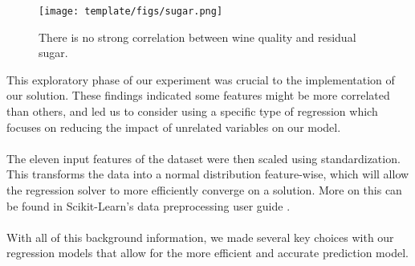 \begin{figure}[htb]

  \centering  %

  \texttt{[image: template/figs/sugar.png]}

  \caption{There is no strong correlation between wine quality and residual sugar.}

  \label{fig:sugar}

\end{figure}
This exploratory phase of our experiment was crucial to the implementation of our solution. These findings indicated some features might be more correlated than others, and led us to consider using a specific type of regression which focuses on reducing the impact of unrelated variables on our model. \\\\
The eleven input features of the dataset were then scaled using standardization. This transforms the data into a normal distribution feature-wise, which will allow the regression solver to more efficiently converge on a solution. More on this can be found in Scikit-Learn’s data preprocessing user guide \cite{sklearn_api}. \\\\
With all of this background information, we made several key choices with our regression models that allow for the more efficient and accurate prediction model. \\\\